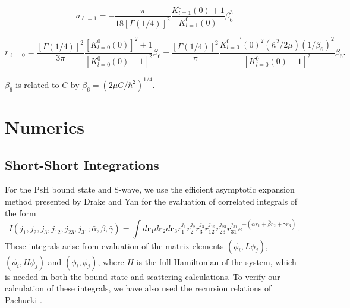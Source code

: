 \documentclass[preprint,showpacs,preprintnumbers,amsmath,amssymb]{revtex4}
\newcommand{\todoi}{\todo[inline]}
\begin{document}
\begin{equation}
\label{eq:GaoScatLenP}
a_{\ell=1} = -\frac{\pi}{18[\Gamma(1/4)]^2} \frac{K_{l=1}^0(0) + 1}{K_{l=1}^0(0)} \beta_6^3
\end{equation}

\begin{equation}
\label{eq:GaoEffRange}
r_{\ell=0} = \frac{[\Gamma(1/4)]^2}{3\pi} \frac{[K_{l=0}^0(0)]^2 + 1}{[K_{l=0}^0(0) - 1]^2} \beta_6 + \frac{[\Gamma(1/4)]^2}{\pi} \frac{{K_{l=0}^0}^\prime(0)^2(\hbar^2/2\mu)(1/\beta_6)^2}{[K_{l=0}^0(0) - 1]^2} \beta_6.
\end{equation}

$\beta_6$ is related to $C$ by $\beta_6 = (2\mu C/\hbar^2)^{1/4}$.


\section{Numerics}
\label{sec:Numerical}

\subsection{Short-Short Integrations}
\label{sec:ShortInt}
For the PsH bound state and S-wave, we use the efficient asymptotic expansion method presented by Drake and Yan \cite{Drake1995} for the evaluation of correlated integrals of the form
\begin{equation}
\label{eq:ShortInt}
I(j_1,j_2,j_3,j_{12},j_{23},j_{31}; \bar{\alpha}, \bar{\beta}, \bar{\gamma}) =
\int
d \textbf{r}_1 d \textbf{r}_2 d \textbf{r}_3
r_1^{j_1} r_2^{j_2} r_3^{j_3} r_{12}^{j_{12}}
r_{23}^{j_{23}} r_{31}^{j_{31}}
e^{-(\bar{\alpha} r_1 + \bar{\beta} r_2 + \bar{\gamma} r_3)}\, .
\end{equation}
These integrals arise from evaluation of the matrix elements $(\phi_i, L \phi_j)$, $(\phi_i, H \phi_j)$ and $(\phi_i, \phi_j)$, where $H$ is the full Hamiltonian of the system,
which is needed in both the bound state and scattering calculations. To verify our calculation of these integrals, we have also used the recursion relations of Pachucki \cite{Pachucki2004}.
\end{document}
